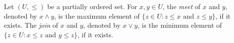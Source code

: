 Let $(U, \leq)$ be a partially ordered set. For $x, y \in U$, the \textit{meet} of $x$ and $y$, denoted by $x \wedge y$, is the maximum element of $\{z \in U: z \leq x \text{ and } z \leq y\}$, if it exists. The \textit{join} of $x$ and $y$, denoted by $x \vee y$, is the minimum element of $\{z \in U: x \leq z \text{ and } y \leq z\}$, if it exists.
